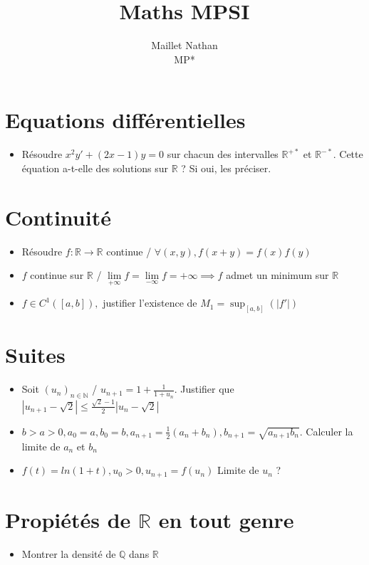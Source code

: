 \documentclass[a4paper, 11pt, french]{article}
\title{Maths MPSI}
\author{Maillet Nathan\\MP*}
\date{}
\newcommand{\R}{\mathbb{R}}
\newcommand{\N}{\mathbb{N}}
\newcommand{\Q}{\mathbb{Q}}
\newcommand{\inv}[1]{\frac{1}{#1}}
\begin{document}
	\maketitle
	\section*{Equations différentielles}
	\begin{itemize}
 		\item Résoudre $x^2y'+(2x-1)y=0$ sur chacun des intervalles $\R^{+*}$ et $\R^{-*}$. Cette équation a-t-elle des solutions sur $\R$ ? Si oui, les 					préciser.
	\end{itemize}	

	\section*{Continuité}
	\begin{itemize}
 		\item Résoudre $f:\R\rightarrow \R$ continue / $\forall(x,y), f(x+y)=f(x)f(y)$
 		\item $f$ continue sur $\R$ / $\underset{+\infty}\lim f=\underset{-\infty}\lim f=+\infty \implies f$ admet un minimum sur $\R$
 		\item  $f \in C^1([a,b]),$ justifier l'existence de $M_1= \sup_{[a,b]}(|f'|)$
	\end{itemize}	

	\section*{Suites}
	\begin{itemize}
 		\item Soit $(u_n)_{n \in \N}$ / $u_{n+1}=1+\inv{1+u_n}.$ Justifier que $|u_{n+1}-\sqrt{2}|\leqslant \frac{\sqrt{2}-1}{2}|u_n-\sqrt{2}|$
 		\item $b>a>0, a_0=a,b_0=b, a_{n+1}=\inv{2}(a_n+b_n),b_{n+1}=\sqrt{a_{n+1}b_n}.$ Calculer la limite de $a_n$ et $b_n$
 		\item $f(t)=ln(1+t), u_0>0, u_{n+1}=f(u_n)$ Limite de $u_n$ ?
	\end{itemize}
	 

	\section*{Propiétés de $\R$ en tout genre}
	\begin{itemize}
 		\item Montrer la densité de $\Q$ dans $\R$
	\end{itemize}
	 
\end{document}
